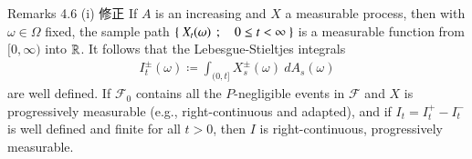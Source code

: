 	\begin{itembox}[l]{Remarks 4.6 (i) 修正}
		If $A$ is an increasing and $X$ a measurable process, then with $\omega \in \Omega$ fixed,
		the sample path $\left\{\ X_t(\omega)\ \, ; \quad 0 \leq t < \infty\ \right\}$ is a measurable function from $[0,\infty)$
		into $\mathbb{R}$. It follows that the Lebesgue-Stieltjes integrals
		\begin{align}
			I^{\pm}_t(\omega) \coloneqq
			\int_{(0,t]} X^\pm_s(\omega)\ dA_s(\omega)
		\end{align}
		are well defined. If $\mathscr{F}_0$ contains all the $P$-negligible events in $\mathscr{F}$ 
		and $X$ is progressively measurable (e.g., right-continuous and adapted), and
		if $I_t = I^+_t - I^-_t$ is well defined and finite for all $t > 0$, then $I$ is right-continuous,
		progressively measurable.
	\end{itembox}
	
